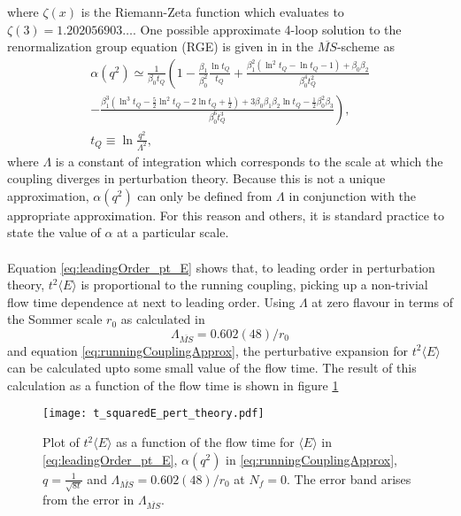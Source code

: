 \documentclass[a4paper,10pt]{book}
\begin{document}
where $\zeta(x)$ is the Riemann-Zeta function which evaluates to $\zeta(3) = 1.202056903 \ldots$. One possible approximate 4-loop solution to the renormalization group equation (RGE) is given in \cite{AgasheK2016ROPP} in the $\overline{MS}$-scheme as
\begin{equation}\label{eq:runningCouplingApprox}
\begin{gathered}
\alpha\left(q^{2}\right) \simeq \frac{1}{\beta_{0} t_Q}\left(1-\frac{\beta_{1}}{\beta_{0}^{2}} \frac{\ln t_Q}{t_Q}+\frac{\beta_{1}^{2}\left(\ln ^{2} t_Q-\ln t_Q-1\right)+\beta_{0} \beta_{2}}{\beta_{0}^{4} t_Q^{2}}\right. \\
\left.-\frac{\beta_{1}^{3}\left(\ln ^{3} t_Q-\frac{5}{2} \ln ^{2} t_Q-2 \ln t_Q+\frac{1}{2}\right)+3 \beta_{0} \beta_{1} \beta_{2} \ln t_Q-\frac{1}{2} \beta_{0}^{2} \beta_{3}}{\beta_{0}^{6} t_Q^{3}}\right), \\
t_Q \equiv \ln \frac{q^{2}}{\Lambda^{2}},
\end{gathered}
\end{equation}
where $\Lambda$ is a constant of integration which corresponds to the scale at which the coupling diverges in perturbation theory. Because this is not a unique approximation, $\alpha\left(q^{2}\right)$ can only be defined from $\Lambda$ in conjunction with the appropriate approximation. For this reason and others, it is standard practice to state the value of $\alpha$ at a particular scale.\\\\Equation \eqref{eq:leadingOrder_pt_E} shows that, to leading order in perturbation theory, $t^{2}\langle E\rangle$ is proportional to the running coupling, picking up a non-trivial flow time dependence at next to leading order. Using $\Lambda$ at zero flavour in terms of the Sommer scale $r_0$ as calculated in \cite{CapitaniStefano1999Nqmr}
\begin{equation}
\Lambda_{\overline{MS}}=0.602(48) / r_{0}
\end{equation}
and equation \eqref{eq:runningCouplingApprox}, the perturbative expansion for $t^2\langle E \rangle$ can be calculated upto some small value of the flow time. The result of this calculation as a function of the flow time is shown in figure \ref{fig:t_squared_E_perturbativeExpansion}
\begin{figure}
\centering
\texttt{[image: t\_squaredE\_pert\_theory.pdf]}
\caption[perturbative expansion of $t^2\langle E \rangle$]{Plot of $t^2\langle E\rangle$ as a function of the flow time for $\langle E\rangle$ in \eqref{eq:leadingOrder_pt_E},  $\alpha\left(q^{2}\right)$ in \eqref{eq:runningCouplingApprox}, $q=\frac{1}{\sqrt{8t}}$ and $\Lambda_{\overline{MS}}=0.602(48) / r_{0}$ at $N_f=0$. The error band arises from the error in $\Lambda_{\overline{MS}}$.}\label{fig:t_squared_E_perturbativeExpansion}
\end{figure}
\end{document}
